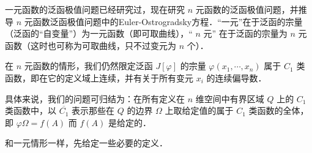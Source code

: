 
一元函数的泛函极值问题已经研究过，现在研究 $n$ 元函数的泛函极值问题，并推导 $n$ 元函数泛函极值问题中的Euler-Ostrogradsky方程．“一元”在于泛函的宗量（泛函的“自变量”）为一元函数（即可取曲线），“ $n$ 元” 在于泛函的宗量为 $n$ 元函数（这时也可称为可取曲线，只不过变元为 $n$ 个）．

在 $n$ 元函数的情形，我们仍然限定泛函 $J[\varphi]$ 的宗量 $\varphi(x_1,\cdots,x_n)$ 属于 $C_1$ 类函数，即在它的定义域上连续，并有关于所有变元 $x_i$ 的连续偏导数．

具体来说，我们的问题可归结为：在所有定义在 $n$ 维空间中有界区域 $Q$ 上的 $C_1$ 类函数中，以 $\overline{C_1}$ 表示那些在 $Q$ 的边界 $\Omega$ 上取给定值的属于 $C_1$ 类函数的全体，即 $\varphi{\Omega}=f(A)$ 而 $f(A)$ 是给定的．

和一元情形一样，先给定一些必要的定义．

